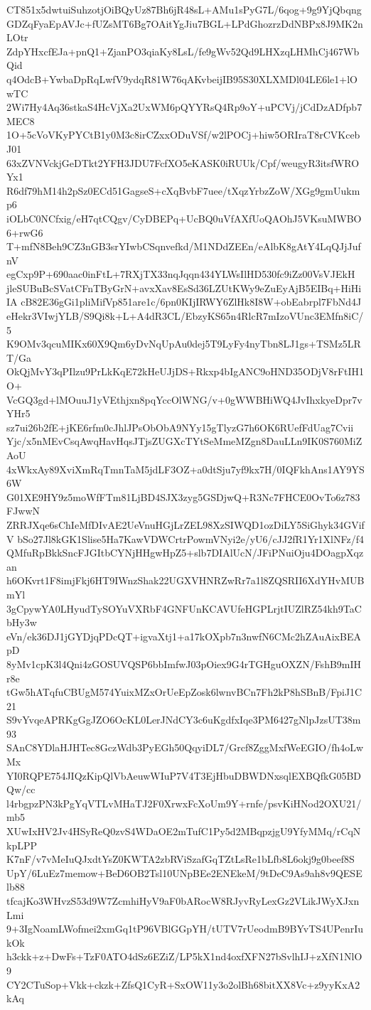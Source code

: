 CT851x5dwtuiSuhzotjOiBQyUz87Bh6jR48sL+AMu1sPyG7L/6qog+9g9YjQbqng
GDZqFyaEpAVJc+fUZsMT6Bg7OAitYgJiu7BGL+LPdGhozrzDdNBPx8J9MK2nLOtr
ZdpYHxcfEJa+pnQ1+ZjanPO3qiaKy8LsL/fe9gWv52Qd9LHXzqLHMhCj467WbQid
q4OdcB+YwbaDpRqLwfV9ydqR81W76qAKvbeijIB95S30XLXMDl04LE6le1+lOwTC
2Wi7Hy4Aq36stkaS4HcVjXa2UxWM6pQYYRsQ4Rp9oY+uPCVj/jCdDzADfpb7MEC8
1O+5cVoVKyPYCtB1y0M3c8irCZxxODuVSf/w2lPOCj+hiw5ORIraT8rCVKcebJ01
63xZVNVckjGeDTkt2YFH3JDU7FcfXO5eKASK0iRUUk/Cpf/weugyR3itsfWROYx1
R6df79hM14h2pSz0ECd51GagseS+cXqBvbF7uee/tXqzYrbzZoW/XGg9gmUukmp6
iOLbC0NCfxig/eH7qtCQgv/CyDBEPq+UcBQ0uVfAXfUoQAOhJ5VKsuMWBO6+rwG6
T+mfN8Beh9CZ3nGB3srYIwbCSqnvefkd/M1NDdZEEn/eAlbK8gAtY4LqQJjJufnV
egCxp9P+690aac0inFtL+7RXjTX33nqJqqn434YLWsIlHD530fc9iZz00VsVJEkH
jleSUBuBcSVatCFnTByGrN+avxXav8EsSd36LZUtKWy9eZuEyAjB5EIBq+HiHiIA
cB82E36gGi1pliMifVp851are1c/6pn0KIjIRWY6ZlHk8I8W+obEabrpl7FbNd4J
eHekr3VIwjYLB/S9Qi8k+L+A4dR3CL/EbzyKS65n4RlcR7mIzoVUnc3EMfn8iC/5
K9OMv3qcuMIKx60X9Qm6yDvNqUpAu0dej5T9LyFy4nyTbn8LJ1gs+TSMz5LRT/Ga
OkQjMvY3qPIlzu9PrLkKqE72kHeUJjDS+Rkxp4bIgANC9oHND35ODjV8rFtIH1O+
VcGQ3gd+lMOuuJ1yVEthjxn8pqYccOlWNG/v+0gWWBHiWQ4JvIhxkyeDpr7vYHr5
sz7ui26b2fE+jKE6rfm0cJhlJPsObObA9NYy15gTlyzG7h6OK6RUefFdUag7Cvii
Yjc/x5nMEvCsqAwqHavHqsJTjsZUGXcTYtSeMmeMZgn8DauLLn9IK0S760MiZAoU
4xWkxAy89XviXmRqTmnTaM5jdLF3OZ+a0dtSju7yf9kx7H/0IQFkhAns1AY9YS6W
G01XE9HY9z5moWfFTm81LjBD4SJX3zyg5GSDjwQ+R3Nc7FHCE0OvTo6z783FJwwN
ZRRJXqe6sChIeMfDIvAE2UeVnuHGjLrZEL98XzSIWQD1ozDiLY5SiGhyk34GVifV
bSo27Jl8kGK1Slise5Ha7KawVDWCrtrPowmVNyi2e/yU6/cJJ2fR1Yr1XlNFz/f4
QMfuRpBkkSncFJGItbCYNjHHgwHpZ5+slb7DIAlUcN/JFiPNuiOju4DOagpXqzan
h6OKvrt1F8imjFkj6HT9IWnzShak22UGXVHNRZwRr7a1l8ZQSRII6XdYHvMUBmYl
3gCpywYA0LHyudTySOYuVXRbF4GNFUnKCAVUfeHGPLrjtIUZlRZ54kh9TaCbHy3w
eVn/ek36DJ1jGYDjqPDcQT+igvaXtj1+a17kOXpb7n3nwfN6CMc2hZAuAixBEApD
8yMv1cpK3l4Qni4zGOSUVQSP6bbImfwJ03pOiex9G4rTGHguOXZN/FshB9mIHr8e
tGw5hATqfuCBUgM574YuixMZxOrUeEpZosk6lwnvBCn7Fh2kP8hSBnB/FpiJ1C21
S9vYvqeAPRKgGgJZO6OcKL0LerJNdCY3c6uKgdfxIqe3PM6427gNlpJzsUT38m93
SAnC8YDlaHJHTec8GczWdb3PyEGh50QqyiDL7/Grcf8ZggMxfWeEGIO/fh4oLwMx
YI0RQPE754JIQzKipQlVbAeuwWIuP7V4T3EjHbuDBWDNxsqlEXBQfkG05BDQw/cc
l4rbgpzPN3kPgYqVTLvMHaTJ2F0XrwxFcXoUm9Y+rnfe/psvKiHNod2OXU21/mb5
XUwIxHV2Jv4HSyReQ0zvS4WDaOE2mTufC1Py5d2MBqpzjgU9YfyMMq/rCqNkpLPP
K7nF/v7vMeIuQJxdtYsZ0KWTA2zbRViSzafGqTZtLsRe1bLfb8L6okj9g0beef8S
UpY/6LuEz7memow+BeD6OB2Tsl10UNpBEe2ENEkeM/9tDeC9As9ah8v9QESElb88
tfcajKo3WHvzS53d9W7ZcmhiHyV9aF0bARocW8RJyvRyLexGz2VLikJWyXJxnLmi
9+3IgNoamLWofmei2xmGq1tP96VBlGGpYH/tUTV7rUeodmB9BYvTS4UPenrIukOk
h3ckk+z+DwFs+TzF0ATO4dSz6EZiZ/LP5kX1nd4oxfXFN27bSvlhIJ+zXfN1NlO9
CY2CTuSop+Vkk+ckzk+ZfsQ1CyR+SxOW11y3o2olBh68bitXX8Vc+z9yyKxA2kAq
